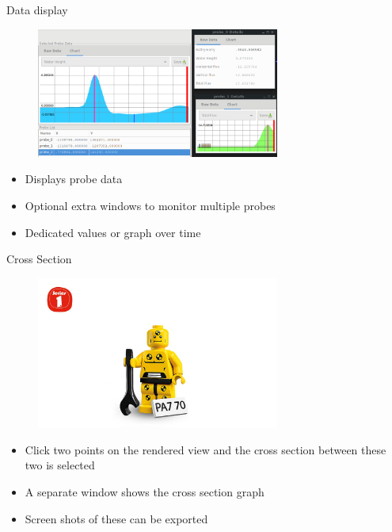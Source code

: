 \documentclass[shortpres,usenames,dvipsnames]{beamer}
\begin{document}
\begin{frame}[fragile]{Data display}
	\begin{figure}
		\includegraphics[clip, width=80mm]{img/datadisplay.png}
	\end{figure}
	\begin{itemize}
		\item Displays probe data
		\item Optional extra windows to monitor multiple probes
		\item Dedicated values or graph over time 
	\end{itemize}
\end{frame}


\begin{frame}[fragile]{Cross Section}
	\begin{figure}
		\includegraphics[clip, width=80mm]{img/dummy_image.jpg}
	\end{figure}
	\begin{itemize}
		\item Click two points on the rendered view and the cross section between these two is selected
		\item A separate window shows the cross section graph
		\item Screen shots of these can be exported
	\end{itemize}
\end{frame}
\end{document}

